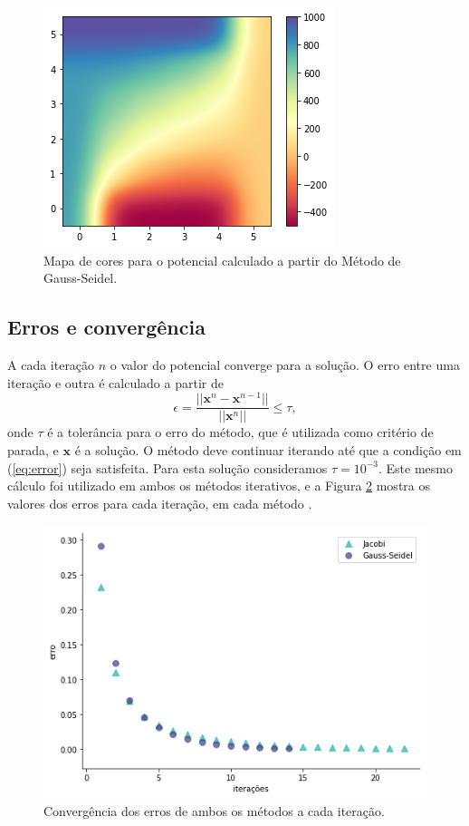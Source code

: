 \documentclass[a4paper,12pt]{article}
\begin{document}
\begin{figure}[H]
\centering
\includegraphics[scale=0.7]{img/gauss_potential}
  \caption{Mapa de cores para o potencial calculado a partir do Método de Gauss-Seidel.}
  \label{fig:gauss}
\end{figure}

\subsection*{Erros e convergência}
A cada iteração $n$ o valor do potencial converge para a solução. O erro entre uma iteração e outra é calculado a partir de
\begin{equation}
  \epsilon = \frac{||\mathbf{x}^n-\mathbf{x}^{n-1}||}{||\mathbf{x}^n||} \leq \tau,
  \label{eq:error}
\end{equation}
onde $\tau$ é a tolerância para o erro do método, que é utilizada como critério de parada, e $\mathbf{x}$ é a solução. O método deve continuar iterando até que a condição em (\ref{eq:error}) seja satisfeita. Para esta solução consideramos $\tau = 10^{-3}$. Este mesmo cálculo foi utilizado em ambos os métodos iterativos, e a Figura \ref{fig:erros} mostra os valores dos erros para cada iteração, em cada método \cite{fdouglasbr.l2003}.

\begin{figure}[H]
\centering
\includegraphics[scale=0.75]{img/errors}
  \caption{Convergência dos erros de ambos os métodos a cada iteração.}
  \label{fig:erros}
\end{figure}
\end{document}
